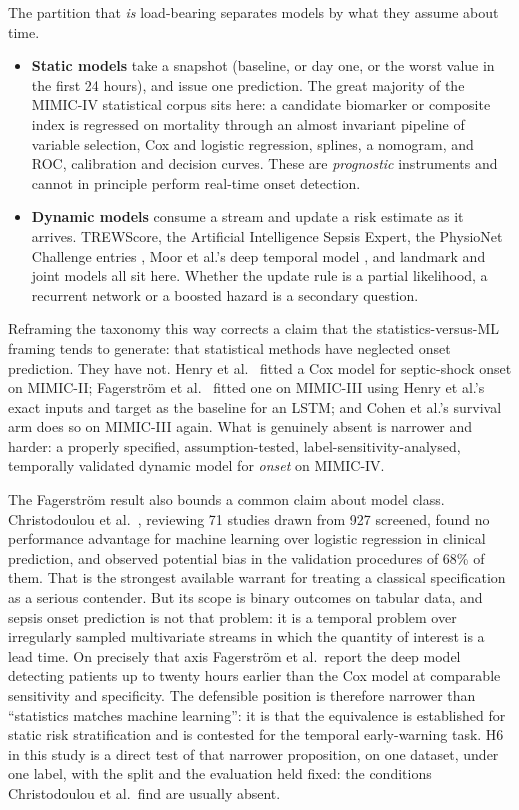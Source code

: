 The partition that \emph{is} load-bearing separates models by what they assume
about time.

\begin{itemize}
    \item \textbf{Static models} take a snapshot (baseline, or day one, or
    the worst value in the first 24 hours), and issue one prediction. The
    great majority of the MIMIC-IV statistical corpus sits here: a candidate
    biomarker or composite index is regressed on mortality through an almost
    invariant pipeline of variable selection, Cox and logistic regression,
    splines, a nomogram, and ROC, calibration and decision curves. These are
    \emph{prognostic} instruments and cannot in principle perform real-time
    onset detection.
    \item \textbf{Dynamic models} consume a stream and update a risk estimate as
    it arrives. TREWScore, the Artificial Intelligence Sepsis Expert, the
    PhysioNet Challenge entries \cite{reyna2020utility}, Moor et al.'s deep
    temporal model \cite{moor2023review}, and landmark and joint models all sit
    here. Whether the update rule is a partial likelihood, a recurrent network
    or a boosted hazard is a secondary question.
\end{itemize}

Reframing the taxonomy this way corrects a claim that the statistics-versus-ML
framing tends to generate: that statistical methods have neglected onset
prediction. They have not. Henry et al.\ \cite{henry2015trewscore} fitted a Cox
model for septic-shock onset on MIMIC-II; Fagerstr{\"o}m et al.\
\cite{fagerstrom2019lisep} fitted one on MIMIC-III using Henry et al.'s exact
inputs and target as the baseline for an LSTM; and Cohen et al.'s survival arm
does so on MIMIC-III again. What is genuinely absent is narrower and harder: a
properly specified, assumption-tested, label-sensitivity-analysed, temporally
validated dynamic model for \emph{onset} on MIMIC-IV.

The Fagerstr{\"o}m result also bounds a common claim about model class.
Christodoulou et al.\ \cite{christodoulou2019cox}, reviewing 71 studies drawn
from 927 screened, found no performance advantage for machine learning over
logistic regression in clinical prediction, and observed potential bias in the
validation procedures of 68\% of them. That is the strongest available warrant
for treating a classical specification as a serious contender. But its scope is
binary outcomes on tabular data, and sepsis onset prediction is not that
problem: it is a temporal problem over irregularly sampled multivariate
streams in which the quantity of interest is a lead time. On precisely that
axis Fagerstr{\"o}m et al.\ report the deep model detecting patients up to
twenty hours earlier than the Cox model at comparable sensitivity and
specificity. The defensible position is therefore narrower than ``statistics
matches machine learning'': it is that the equivalence is established for
static risk stratification and is contested for the temporal early-warning
task. H6 in this study is a direct test of that narrower proposition, on one
dataset, under one label, with the split and the evaluation held fixed: the
conditions Christodoulou et al.\ find are usually absent.

